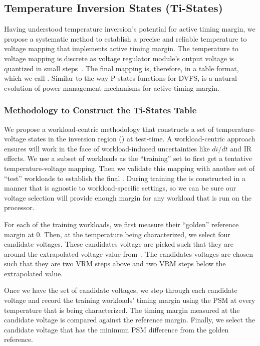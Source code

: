 \subsection{Temperature Inversion States (Ti-States)}
\label{sec:tistate:tistate}

Having understood temperature inversion's potential for active timing margin, we propose a systematic method to establish a precise and reliable temperature to voltage mapping that implements active timing margin. The temperature to voltage mapping is discrete as voltage regulator module's output voltage is quantized in small steps~\cite{intelVRM}. The final mapping is, therefore, in a table format, which we call \tistates. Similar to the way P-states functions for DVFS, \tistate is a natural evolution of power management mechanisms for active timing margin.

\subsubsection{Methodology to Construct the Ti-States Table}
\label{sec:tistate:tistate:construct}

We propose a workload-centric methodology that constructs a set of temperature-voltage states in the inversion region (\tistates) at test-time. A workload-centric approach ensures \tistates will work in the face of workload-induced uncertainties like $di/dt$ and IR effects. We use a subset of workloads as the ``training'' set to first get a tentative temperature-voltage mapping. Then we validate this mapping with another set of ``test'' workloads to establish the final \tistate. During training the \tistate is constructed in a manner that is agnostic to workload-specific settings, so we can be sure our voltage selection will provide enough margin for any workload that is run on the processor.

For each of the training workloads, we first measure their ``golden'' reference margin at 0\C. Then, at the temperature being characterized, we select four candidate voltages. These candidates voltage are picked such that they are around the extrapolated voltage value from~. The candidates voltages are chosen such that they are two VRM steps above and two VRM steps below the extrapolated value. 

Once we have the set of candidate voltages, we step through each candidate voltage and record the training workloads' timing margin using the PSM at every temperature that is being characterized. The timing margin measured at the candidate voltage is compared against the reference margin. Finally, we select the candidate voltage that has the minimum PSM difference from the golden reference. 

